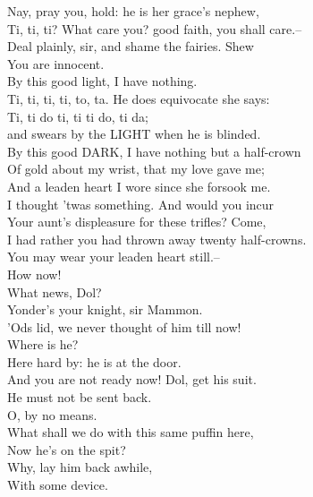 \documentclass{memoir}
\begin{document}
\begin{drama*}
\facespeaks {} Nay, pray you, hold: he is her grace's nephew,\\
 Ti, ti, ti? What care you? good faith, you shall care.--\\
 Deal plainly, sir, and shame the fairies. Shew\\
 You are innocent.\\
\dapperspeaks {} By this good light, I have nothing.\\
\subtlespeaks  Ti, ti, ti, ti, to, ta. He does equivocate she says:\\
 Ti, ti do ti, ti ti do, ti da;\\
 and swears by the LIGHT when he is blinded.\\
\dapperspeaks  By this good DARK, I have nothing but a half-crown\\
 Of gold about my wrist, that my love gave me;\\
 And a leaden heart I wore since she forsook me.\\
\facespeaks  I thought 'twas something. And would you incur\\
 Your aunt's displeasure for these trifles? Come,\\
 I had rather you had thrown away twenty half-crowns.\\
 You may wear your leaden heart still.--\\
 How now!\\
\subtlespeaks {} What news, Dol?\\
\dolspeaks {} Yonder's your knight, sir Mammon.\\
\facespeaks  'Ods lid, we never thought of him till now!\\
 Where is he?\\
\dolspeaks {} Here hard by: he is at the door.\\
\subtlespeaks  And you are not ready now! Dol, get his suit.\\
 He must not be sent back.\\
\facespeaks {} O, by no means.\\
 What shall we do with this same puffin here,\\
 Now he's on the spit?\\
\subtlespeaks {} Why, lay him back awhile,\\
 With some device.\\

\end{drama*}
\end{document}
